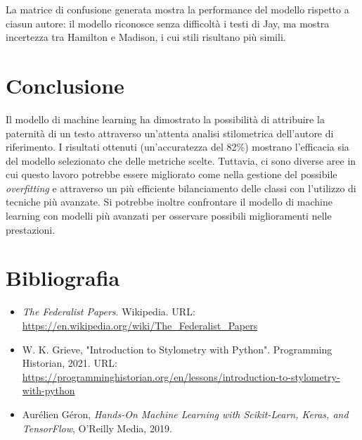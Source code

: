 \documentclass[a4paper, 12pt]{article}
\begin{document}
La matrice di confusione generata mostra la performance del modello rispetto a ciasun autore: il modello riconosce senza difficoltà i testi di Jay, ma mostra incertezza tra Hamilton e Madison, i cui stili risultano più simili.

\section{\textbf{Conclusione}}
Il modello di machine learning ha dimostrato la possibilità di attribuire la paternità di un testo attraverso un'attenta analisi stilometrica dell'autore di riferimento. I risultati ottenuti (un'accuratezza del 82\%) mostrano l'efficacia sia del modello selezionato che delle metriche scelte. 
Tuttavia, ci sono diverse aree in cui questo lavoro potrebbe essere migliorato come nella gestione del possibile \textit{overfitting} e attraverso un più efficiente bilanciamento delle classi con l'utilizzo di tecniche più avanzate. Si potrebbe inoltre confrontare il modello di machine learning con modelli più avanzati per osservare possibili miglioramenti nelle prestazioni. 

\section{\textbf{Bibliografia}}
\begin{itemize}
	\item \textit{The Federalist Papers}. Wikipedia. URL: \url{https://en.wikipedia.org/wiki/The_Federalist_Papers}
	\item W. K. Grieve, "Introduction to Stylometry with Python". Programming Historian, 2021. URL: \url{https://programminghistorian.org/en/lessons/introduction-to-stylometry-with-python}
	\item Aurélien Géron, \textit{Hands-On Machine Learning with Scikit-Learn, Keras, and TensorFlow}, O'Reilly Media, 2019.

\end{itemize}
\end{document}
